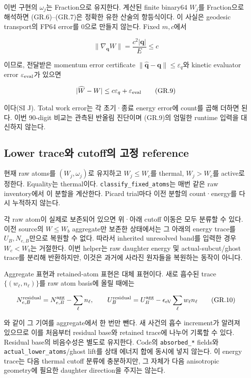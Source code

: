 \documentclass[11pt,a4paper]{article}
\begin{document}
이번 구현의 \(\omega_j\)는 Fraction으로 유지한다. 계산된 finite binary64 \(W_j\)를 Fraction으로 해석하면 (GR.6)--(GR.7)은 정확한 유한 산술의 항등식이다. 이 사실은 geodesic transport의 FP64 error를 0으로 만들지 않는다. Fixed \(m,c\)에서

\[
 \|\nabla_{\mathbf q}W\|=\frac{c^2|\mathbf q|}{E}\le c
\tag{GR.8}
\]

이므로, 전달받은 momentum error certificate \(\|\widehat{\mathbf q}-\mathbf q\|\le\varepsilon_q\)와 kinetic evaluator error \(\varepsilon_{\rm eval}\)가 있으면

\[
 |\widehat W-W|\le c\varepsilon_q+\varepsilon_{\rm eval}
\tag{GR.9}
\]

이다(SI J). Total work error는 각 초기·종료 energy error에 count를 곱해 더하면 된다. 이번 90-digit 비교는 관측된 반올림 진단이며 (GR.9)의 엄밀한 runtime 입력을 대신하지 않는다.

\hypertarget{lower-traceuxc640-cutoffuxc758-uxace0uxc815-reference}{%
\subsection{Lower trace와 cutoff의 고정 reference}\label{lower-traceuxc640-cutoffuxc758-uxace0uxc815-reference}}

현재 raw atoms를 \((W_j,\omega_j)\)로 유지하고 \(W_j\le W_c\)를 thermal, \(W_j>W_c\)를 active로 정한다. Equality는 thermal이다. \texttt{classify\_fixed\_atoms}는 매번 같은 raw inventory에서 이 분할을 계산한다. Picard trial마다 이전 분할의 count·energy를 다시 누적하지 않는다.

각 raw atom이 실제로 보존되어 있으면 위·아래 cutoff 이동은 모두 분류할 수 있다. 이전 source의 \(W\le W_b\) aggregate만 보존한 상태에서는 그 아래의 energy trace를 \(U_B,N_{e,B}\)만으로 복원할 수 없다. 따라서 inherited unresolved band를 입력한 경우 \(W_c<W_b\)는 거절한다. 이번 helper는 raw daughter energy 및 actual-subcut/ghost trace를 분리해 반환하지만, 이것은 과거에 사라진 원자들을 복원하는 동작이 아니다.

Aggregate 표현과 retained-atom 표현은 대체 표현이다. 새로 흡수된 trace \(\{(w_\ell,n_\ell)\}\)를 raw atom basis에 올릴 때에는

\[
 N_{e,B}^{\rm residual}=N_{e,B}^{\rm agg}-\sum_\ell n_\ell,\qquad
 U_B^{\rm residual}=U_B^{\rm agg}-\epsilon_{\rm eV}\sum_\ell w_\ell n_\ell
\tag{GR.10}
\]

와 같이 그 기여를 aggregate에서 한 번만 뺀다. 새 사건의 흡수 increment가 알려져 있으므로 이를 처음부터 residual base와 retained trace에 나누어 기록할 수 있다. Residual base의 비음수성은 별도로 유지한다. Code의 \texttt{absorbed\_*} fields와 \texttt{actual\_lower\_atoms}/ghost lift를 상태 에너지 합에 동시에 넣지 않는다. 이 energy trace는 다음 thermal cutoff 분류에 충분하지만, 그 자체가 다음 anisotropic geometry에 필요한 daughter direction을 주지는 않는다.
\end{document}
